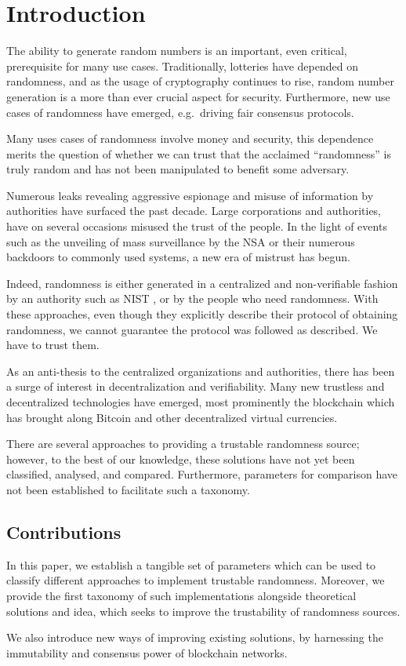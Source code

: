 \section{Introduction}\label{cha:introduction}

The ability to generate random numbers is an important, even critical, prerequisite for many use cases.
Traditionally, lotteries have depended on randomness, and as the usage of cryptography continues to rise, random number generation is a more than ever crucial aspect for security.
Furthermore, new use cases of randomness have emerged, e.g.\ driving fair consensus protocols.

Many uses cases of randomness involve money and security, this dependence merits the question of whether we can trust that the acclaimed \enquote{randomness} is truly random and has not been manipulated to benefit some adversary.

Numerous leaks revealing aggressive espionage and misuse of information by authorities have surfaced the past decade.
Large corporations and authorities, have on several occasions misused the trust of the people.
In the light of events such as the unveiling of mass surveillance by the NSA or their numerous backdoors to commonly used systems, a new era of mistrust has begun.

Indeed, randomness is either generated in a centralized and non-verifiable fashion by an authority such as NIST , or by the people who need randomness.
With these approaches, even though they explicitly describe their protocol of obtaining randomness, we cannot guarantee the protocol was followed as described.
We have to trust them. 

As an anti-thesis to the centralized organizations and authorities, there has been a surge of interest in decentralization and verifiability.
Many new trustless and decentralized technologies have emerged, most prominently the blockchain which has brought along Bitcoin and other decentralized virtual currencies.

There are several approaches to providing a trustable randomness source; however, to the best of our knowledge, these solutions have not yet been classified, analysed, and compared.
Furthermore, parameters for comparison have not been established to facilitate such a taxonomy.

\subsection*{Contributions}\label{subsec:contributions}
In this paper, we establish a tangible set of parameters which can be used to classify different approaches to implement trustable randomness.
Moreover, we provide the first taxonomy of such implementations alongside theoretical solutions and idea, which seeks to improve the trustability of randomness sources.

We also introduce new ways of improving existing solutions, by harnessing the immutability and consensus power of blockchain networks.


